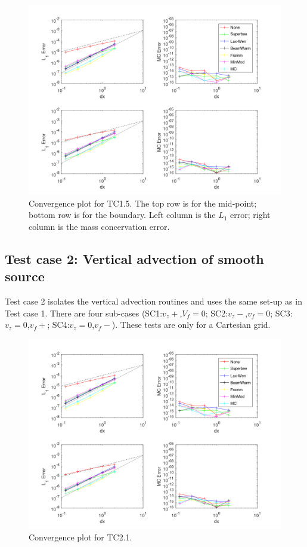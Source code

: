 \begin{figure}[htbp]\vspace*{0cm}\hspace*{0cm}
\includegraphics[angle=0,scale=0.3]{Figures/Apx_Test/TC1_LL_Sub5.png}
\parbox{15cm}{\caption{\label{FigTest_ConvTC15_grid}
Convergence plot for TC1.5. The top row is for the mid-point; bottom
row is for the boundary. Left column is the $L_1$ error; right column
is the mass concervation error.
}}
\end{figure}

\subsection{Test case 2: Vertical advection of smooth source}
Test case 2 isolates the vertical advection routines and uses the same set-up as in
Test case 1. There are four sub-cases
(SC1:$v_z+$,$V_f=0$; SC2:$v_z-$,$v_f=0$; SC3:$v_z=0$,$v_f+$; SC4:$v_z=0$,$v_f-$).
These tests are only for a Cartesian grid.
\begin{figure}[htbp]\vspace*{0cm}\hspace*{0cm}
\includegraphics[angle=0,scale=0.3]{Figures/Apx_Test/TC1_LL_Sub5.png}
\parbox{15cm}{\caption{\label{FigTest_ConvTC21_grid}
Convergence plot for TC2.1.
}}
\end{figure}

